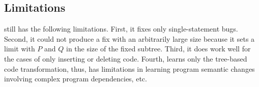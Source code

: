 \subsection{Limitations}
\label{sec:limitations}

{\tool} still has the following limitations. First, it fixes only
single-statement bugs. Second, it could not produce a fix with an
arbitrarily large size because it sets a limit with $P$ and $Q$ in the
size of the fixed subtree. Third, it does work well for the cases of
only inserting or deleting code. Fourth, {\tool} learns only the
tree-based code transformation, thus, has limitations in learning
program semantic changes involving complex program dependencies, etc.
